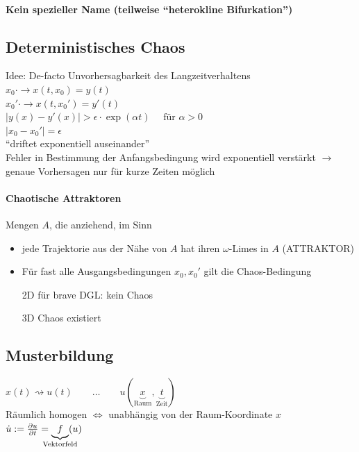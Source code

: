 \paragraph{Kein spezieller Name (teilweise "`heterokline Bifurkation"')}

\subsection{Deterministisches Chaos}
Idee: De-facto Unvorhersagbarkeit des Langzeitverhaltens
$ x_0 \cdot \rightarrow x(t, x_0) = y(t) $ \\
$ x_0' \cdot \rightarrow x(t, x_0') = y'(t) $ \\
$ | y(x) - y'(x) | > \epsilon \cdot \exp(\alpha t) \quad \text{ für } \alpha > 0 $ \\
$ | x_0 - x_0' | = \epsilon $ \\
"`driftet exponentiell auseinander"' \\
Fehler in Bestimmung der Anfangsbedingung wird exponentiell verstärkt $\rightarrow$ genaue Vorhersagen nur für kurze Zeiten möglich
\paragraph{Chaotische Attraktoren}
Mengen $A$, die anziehend, im Sinn \\
\begin{itemize}  %
    \item jede Trajektorie aus der Nähe von $A$ hat ihren $\omega$-Limes in $A$ (ATTRAKTOR)
    \item Für fast alle Ausgangsbedingungen $x_0, x_0'$ gilt die Chaos-Bedingung
    \item[2D] für brave DGL: kein Chaos
    \item[3D] Chaos existiert
\end{itemize}

\subsection{Musterbildung}
$ x(t) \rightsquigarrow u(t) \qquad \dots \qquad u(\underbrace{x}_{\text{Raum}}, \underbrace{t}_{\text{Zeit}}) $ \\
Räumlich homogen $\Leftrightarrow$ unabhängig von der Raum-Koordinate $x$ \\
$ \dot{u} := \frac{\partial u}{\partial t} = \underbrace{f}_{\mathclap{\text{Vektorfeld}}}(u) $

